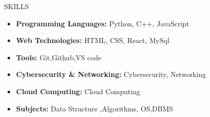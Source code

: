 \documentclass{resume}
\begin{document}
\vspace{-0.2em}
\begin{rSection}{SKILLS}
    
        \begin{itemize}
            \item \textbf{Programming Languages:} Python, C++, JavaScript
            \item \textbf{Web Technologies:} HTML, CSS, React, MySql
            \item \textbf{Tools:} Git,Github,VS code
            \item \textbf{Cybersecurity \& Networking:} Cybersecurity, Networking
            \item \textbf{Cloud Computing:} Cloud Computing
            \item \textbf{Subjects:} Data Structure ,Algorithms, OS,DBMS
        \end{itemize}
        
\end{rSection}
\vspace{-0.6em}
\end{document}

